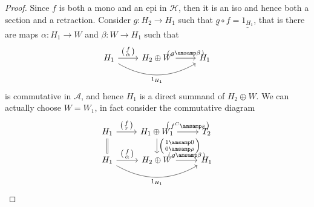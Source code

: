 \begin{proof}
  Since $f$ is both a mono and an epi in $\mathcal{H}$, then it is an iso and hence
  both a section and a retraction. Consider $g:H_2\to H_1$ such that
  $\underline{g}\circ\underline{f} = \underline{1_{H_1}}$, that is there are maps $\alpha:H_1\to W$ and
  $\beta:W\to H_1$ such that
  \begin{equation*}
    \begin{tikzcd}
      H_1\arrow{r}{
        \begin{psmallmatrix}
          f\\ \alpha
        \end{psmallmatrix}
      }\arrow[bend right]{rr}[']{1_{H_1}}
      & H_2\oplus W \arrow{r}{
        \begin{psmallmatrix}
          g\amsamp \beta
        \end{psmallmatrix}
        }
        & H_1
    \end{tikzcd}
  \end{equation*}
  is commutative in $\mathcal{A}$, and hence $H_1$ is a direct summand of $H_2\oplus W$. We can actually choose $W=W_1$,
  in fact consider the commutative diagram
  \begin{equation*}
    \begin{tikzcd}
      H_1\arrow[equal]{d}\arrow{r}{
        \begin{psmallmatrix}
          f \\ r
        \end{psmallmatrix}
      }
        & H_1\oplus W_1 \arrow{r}{
          \begin{psmallmatrix}
            f^C \amsamp s
          \end{psmallmatrix}
        }\arrow{d}{
          \begin{psmallmatrix}
            1 \amsamp 0\\
            0 \amsamp \rho
          \end{psmallmatrix}
        }
          & T_2
      \\
      H_1\arrow{r}{
        \begin{psmallmatrix}
          f\\ \alpha
        \end{psmallmatrix}
      }\arrow[bend right]{rr}[']{1_{H_1}}
      & H_2\oplus W \arrow{r}{
        \begin{psmallmatrix}
          g\amsamp \beta
        \end{psmallmatrix}
        }
        & H_1
    \end{tikzcd}
  \end{equation*}

\end{proof}
